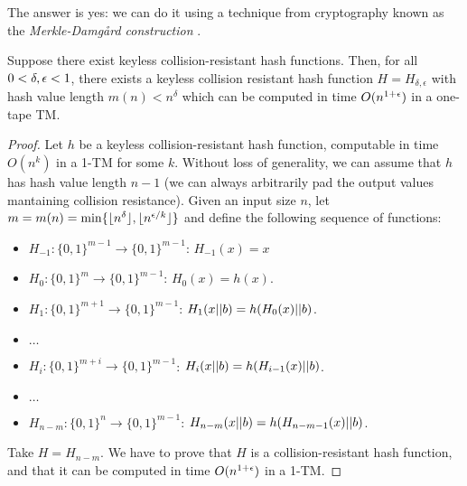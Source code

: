 The answer is yes: we can do it using a technique from cryptography known as the \emph{Merkle-Damgård construction} \cite{Merkle90, Damgard90}.

\begin{theorem}
\label{thm:hashonetape}
Suppose there exist keyless collision-resistant hash functions. Then, for all $0 < \delta, \epsilon < 1$, there exists a keyless collision resistant hash
function $H = H_{\delta, \epsilon}$ with hash value length $m(n) < n^\delta$ which can be computed in time $O(n^{1+\epsilon})$ in a one-tape
TM.
\end{theorem}

\begin{proof}
Let $h$ be a keyless collision-resistant hash function, computable in time $O(n^k)$ in a 1-TM for some $k$.
Without loss of generality, we can assume that $h$ has hash value length $n-1$ (we can always arbitrarily
pad the output values mantaining collision resistance). Given an input size $n$, 
let $m = m(n) = \min\{\lfloor n^\delta \rfloor,  \lfloor n^{\epsilon/k} \rfloor \}$ and define the following sequence of functions:

\begin{itemize}
    \item[] $H_{-1} \colon \{0, 1\}^{m-1} \to \{0, 1\}^{m-1}$: $H_{-1}(x) = x$
    \item[] $H_0 \colon \{0, 1\}^m \to \{0, 1\}^{m-1}$: $H_0(x) = h(x)$.
    \item[] $H_1 \colon \{0, 1\}^{m+1} \to \{0, 1\}^{m-1}$: $H_1(x || b) = h(H_0(x) || b)$.
    \item[] $\dots$
    \item[] $H_i \colon \{0, 1\}^{m+i} \to \{0, 1\}^{m-1}$: $H_i(x || b) = h(H_{i-1}(x) || b)$.
    \item[] $\dots$
    \item[] $H_{n-m} \colon \{0, 1\}^{n} \to \{0, 1\}^{m-1}$: $H_{n-m}(x || b) = h(H_{n-m-1}(x) || b)$.
\end{itemize}
 

Take $H = H_{n-m}$. We have to prove that $H$ is a collision-resistant hash function, and that it can be
computed in time $O(n^{1+\epsilon})$ in a 1-TM. 


\end{proof}
